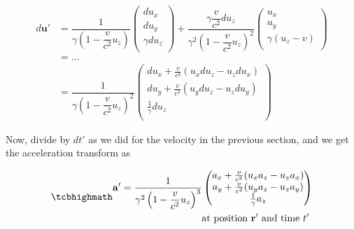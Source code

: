 \begin{equation}
	\begin{aligned}
		d\mathbf{u}{'} & = \dfrac{1}{{\gamma}\left(1-\dfrac{v}{{c}^2} {{u}_{z}}\right) }
		\begin{pmatrix}
			d{{u}_{x}}          \\
			d{{u}_{y}}          \\
			{\gamma} d{{u}_{z}} \\
		\end{pmatrix}
		+ \dfrac{{\gamma} \dfrac{v}{{c}^2} d{{u}_{z}}}{{\gamma}^2\left(1-\dfrac{v}{{c}^2} {{u}_{z}}\right)^2 }
		\begin{pmatrix}
			{{u}_{x}}                              \\
			{{u}_{y}}                              \\
			{\gamma} \left( {{u}_{z}}- {v} \right) \\
		\end{pmatrix} \\
		               & = ...
		\\
		               & = \dfrac{1}{{\gamma}\left(1-\dfrac{v}{{c}^2} {{u}_{z}}\right)^2 }
		\begin{pmatrix}
			d{{u}_{x}} + \frac{v}{{c}^2}( {{u}_{x}} d{{u}_{z}}-{{u}_{z}} d{{u}_{x}}) \\
			d{{u}_{y}} + \frac{v}{{c}^2}( {{u}_{y}} d{{u}_{z}}-{{u}_{z}} d{{u}_{y}}) \\
			\frac{1}{{\gamma}} d{{u}_{z}}                                            \\
		\end{pmatrix}
	\end{aligned}
\end{equation}

Now, divide by ${dt{'}}$ as we did for the velocity in the previous section, and we get the acceleration transform as

\begin{equation}
	\mhl{
		\begin{aligned}
			\mathbf{a}{'} = \dfrac{1}{{\gamma}^2\left(1-\dfrac{v}{{c}^2} {{u}_{z}}\right)^3 }
			\begin{pmatrix}
				{{a}_{x}} + \frac{v}{{c}^2}({{u}_{x}} {{a}_{z}}-{{u}_{z}} {{a}_{x}}) \\
				{{a}_{y}} + \frac{v}{{c}^2}({{u}_{y}} {{a}_{z}}-{{u}_{z}} {{a}_{y}}) \\
				\frac{1}{{\gamma}} {{a}_{z}}                                         \\
			\end{pmatrix}
			\\
			\text{at position ${\mathbf{r}{'}}$ and time ${t{'}}$ }
		\end{aligned}
	}
	\label{eq: acceleration transform}
\end{equation}

